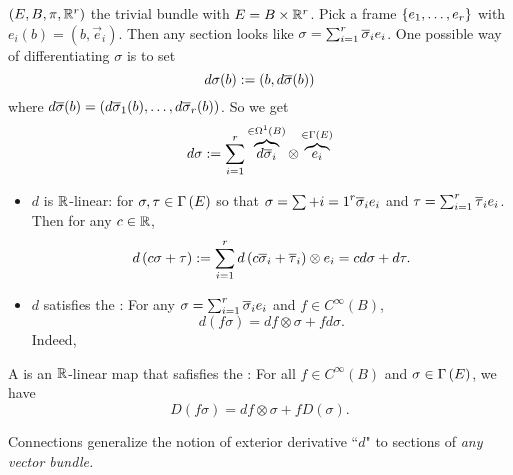 \documentclass[main.tex]{subfiles}
\begin{document}
 $(E, B, \pi, \mathbb{R}^r)$ the trivial bundle with $E = B \times \mathbb{R}^r$. Pick a frame $\left\{e_1, \dots, e_r\right\}$ with $e_i(b) = (b, \vec{e}_i)$. Then any section looks like $\sigma = \sum_{i=1}^r \overline{\sigma}_i e_i$. One possible way of differentiating $\sigma$ is to set
\[
d\sigma(b):= (b, d \overline{\sigma}(b))
\]
where $d\overline{\sigma}(b) = \left(  d\overline{\sigma}_1(b), \dots, d \overline{\sigma}_r(b)  \right)$. So we get 
\[
d \sigma := \sum_{i=1}^r  \overbrace{d\overline{\sigma}_i}^{\in \Omega^1(B)} \otimes \overbrace{e_i}^{\in \Gamma\left( E \right)}
\]

\begin{note}
    \begin{itemize}
        \item $d$ is $\mathbb{R}$-linear: for $\sigma, \tau \in \Gamma\left( E \right)$ so that $\sigma = \sum+{i=1}^r \overline{\sigma}_i e_i$ and $\tau = \sum_{i=1}^r \overline{\tau}_i e_i$. Then for any $c \in \mathbb{R}$, 
        \[
        d\left(  c\sigma + \tau  \right) := \sum_{i=1}^r d\left(  c \overline{\sigma}_i + \overline{\tau}_i  \right) \otimes e_i = cd\sigma + d\tau.
        \]
        \item $d$ satisfies the : For any $\sigma = \sum_{i=1}^r \overline{\sigma}_i e_i$ and $f \in C^\infty(B)$, 
        \[
        d(f\sigma) = df \otimes \sigma + f d\sigma.
        \]
        Indeed,
    \end{itemize}
\end{note}

\begin{defn}
A  is an $\mathbb{R}$-linear map 
that safisfies the : For all $f \in C^\infty(B)$ and $\sigma \in \Gamma\left( E \right)$, we have
\[
D(f\sigma) = df \otimes \sigma + f D(\sigma).
\]
\end{defn}

\begin{note}
Connections generalize the notion of exterior derivative ``$d$" to sections of \it{any} vector bundle. 
\end{note}
\end{document}
